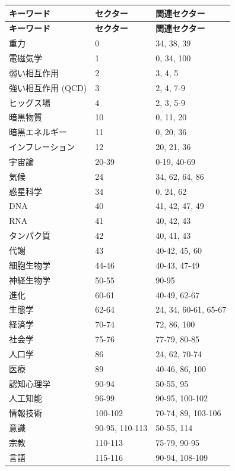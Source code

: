 \documentclass[13pt,a4paper]{ltjsarticle}
\begin{document}
	\begin{longtable}{|p{5cm}|p{3cm}|p{4cm}|}
		\hline
		\textbf{キーワード} & \textbf{セクター} & \textbf{関連セクター} \\
		\hline
		\endfirsthead
		\hline
		\textbf{キーワード} & \textbf{セクター} & \textbf{関連セクター} \\
		\hline
		\endhead
		
		重力 & 0 & 34, 38, 39 \\
		電磁気学 & 1 & 0, 34, 100 \\
		弱い相互作用 & 2 & 3, 4, 5 \\
		強い相互作用 (QCD) & 3 & 2, 4, 7-9 \\
		ヒッグス場 & 4 & 2, 3, 5-9 \\
		暗黒物質 & 10 & 0, 11, 20 \\
		暗黒エネルギー & 11 & 0, 20, 36 \\
		インフレーション & 12 & 20, 21, 36 \\
		宇宙論 & 20-39 & 0-19, 40-69 \\
		気候 & 24 & 34, 62, 64, 86 \\
		惑星科学 & 34 & 0, 24, 62 \\
		DNA & 40 & 41, 42, 47, 49 \\
		RNA & 41 & 40, 42, 43 \\
		タンパク質 & 42 & 40, 41, 43 \\
		代謝 & 43 & 40-42, 45, 60 \\
		細胞生物学 & 44-46 & 40-43, 47-49 \\
		神経生物学 & 50-55 & 90-95 \\
		進化 & 60-61 & 40-49, 62-67 \\
		生態学 & 62-64 & 24, 34, 60-61, 65-67 \\
		経済学 & 70-74 & 72, 86, 100 \\
		社会学 & 75-76 & 77-79, 80-85 \\
		人口学 & 86 & 24, 62, 70-74 \\
		医療 & 89 & 40-46, 86, 100 \\
		認知心理学 & 90-94 & 50-55, 95 \\
		人工知能 & 96-99 & 90-95, 100-102 \\
		情報技術 & 100-102 & 70-74, 89, 103-106 \\
		意識 & 90-95, 110-113 & 50-55, 114 \\
		宗教 & 110-113 & 75-79, 90-95 \\
		言語 & 115-116 & 90-94, 108-109 \\
		\hline
	\end{longtable}
	
\end{document}
